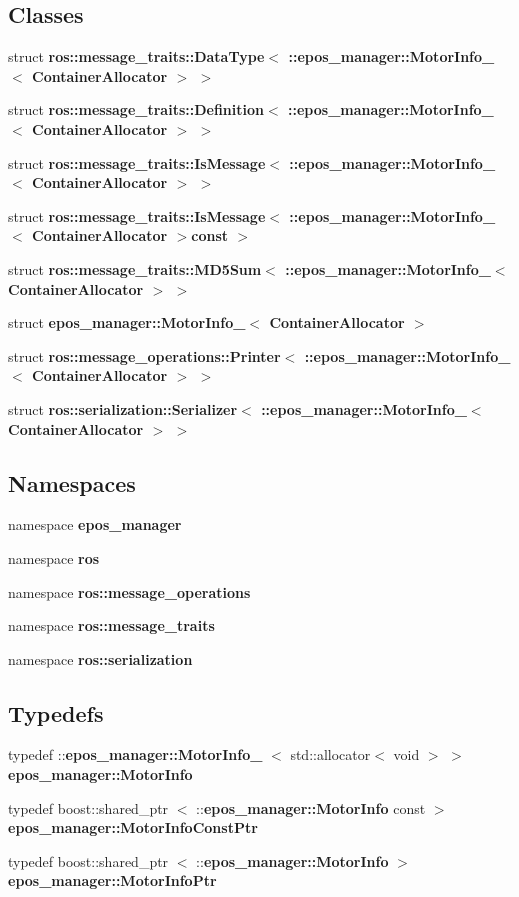 \subsection*{\-Classes}
\begin{DoxyCompactItemize}
\item 
struct {\bf ros\-::message\-\_\-traits\-::\-Data\-Type$<$ \-::epos\-\_\-manager\-::\-Motor\-Info\-\_\-$<$ Container\-Allocator $>$ $>$}
\item 
struct {\bf ros\-::message\-\_\-traits\-::\-Definition$<$ \-::epos\-\_\-manager\-::\-Motor\-Info\-\_\-$<$ Container\-Allocator $>$ $>$}
\item 
struct {\bf ros\-::message\-\_\-traits\-::\-Is\-Message$<$ \-::epos\-\_\-manager\-::\-Motor\-Info\-\_\-$<$ Container\-Allocator $>$ $>$}
\item 
struct {\bf ros\-::message\-\_\-traits\-::\-Is\-Message$<$ \-::epos\-\_\-manager\-::\-Motor\-Info\-\_\-$<$ Container\-Allocator $>$const  $>$}
\item 
struct {\bf ros\-::message\-\_\-traits\-::\-M\-D5\-Sum$<$ \-::epos\-\_\-manager\-::\-Motor\-Info\-\_\-$<$ Container\-Allocator $>$ $>$}
\item 
struct {\bf epos\-\_\-manager\-::\-Motor\-Info\-\_\-$<$ Container\-Allocator $>$}
\item 
struct {\bf ros\-::message\-\_\-operations\-::\-Printer$<$ \-::epos\-\_\-manager\-::\-Motor\-Info\-\_\-$<$ Container\-Allocator $>$ $>$}
\item 
struct {\bf ros\-::serialization\-::\-Serializer$<$ \-::epos\-\_\-manager\-::\-Motor\-Info\-\_\-$<$ Container\-Allocator $>$ $>$}
\end{DoxyCompactItemize}
\subsection*{\-Namespaces}
\begin{DoxyCompactItemize}
\item 
namespace {\bf epos\-\_\-manager}
\item 
namespace {\bf ros}
\item 
namespace {\bf ros\-::message\-\_\-operations}
\item 
namespace {\bf ros\-::message\-\_\-traits}
\item 
namespace {\bf ros\-::serialization}
\end{DoxyCompactItemize}
\subsection*{\-Typedefs}
\begin{DoxyCompactItemize}
\item 
typedef \*
\-::{\bf epos\-\_\-manager\-::\-Motor\-Info\-\_\-}\*
$<$ std\-::allocator$<$ void $>$ $>$ {\bf epos\-\_\-manager\-::\-Motor\-Info}
\item 
typedef boost\-::shared\-\_\-ptr\*
$<$ \-::{\bf epos\-\_\-manager\-::\-Motor\-Info} \*
const  $>$ {\bf epos\-\_\-manager\-::\-Motor\-Info\-Const\-Ptr}
\item 
typedef boost\-::shared\-\_\-ptr\*
$<$ \-::{\bf epos\-\_\-manager\-::\-Motor\-Info} $>$ {\bf epos\-\_\-manager\-::\-Motor\-Info\-Ptr}
\end{DoxyCompactItemize}
